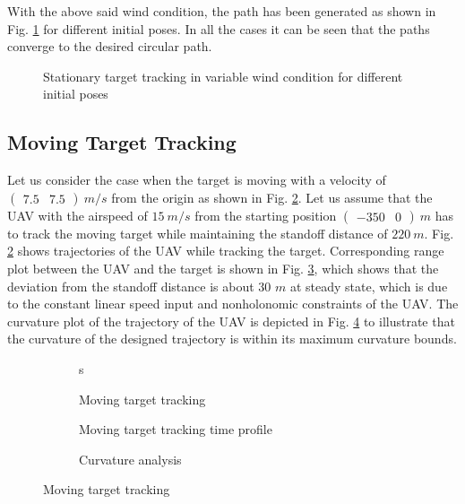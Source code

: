 \documentclass[Afour,sagev,times]{sagej}
\begin{document}
With the above said wind condition, the path has been generated as shown in Fig. \ref{fig:diffgg} for different initial poses.  In all the cases it can be seen that the paths converge to the desired circular path.

\begin{figure}[htpb]
	\centering
	\caption{Stationary target tracking in variable wind condition for different initial poses} 
	\label{fig:diffgg}
\end{figure}

\subsection{Moving Target Tracking}
Let us consider the case when the target is moving with a velocity of $\begin{pmatrix}
7.5 & 7.5 \end{pmatrix}~m/s$ from the origin as shown in Fig. \ref{fig:targ}. Let us assume that the UAV with the airspeed of $15~m/s$ from the starting position  $\begin{pmatrix} - 350& 0 \end{pmatrix}~m$ has to track the moving target while maintaining the standoff distance of $220~m$. Fig. \ref{fig:targ} shows trajectories of the UAV while tracking the target. Corresponding range plot between the UAV and the target is shown in Fig. \ref{fig:targ_time}, which shows that the deviation from the standoff distance is about $30$ $m$ at steady state, which is due to the constant linear speed input and nonholonomic constraints of the UAV. The curvature plot of the  trajectory of the UAV is depicted in Fig. \ref{fig:ka} to illustrate that the curvature of the designed trajectory is within its maximum curvature bounds.

\begin{figure}[htpb]
	\begin{subfigure}{0.5\textwidth}
	\centering
	\caption{Moving target tracking}s
	\label{fig:targ}
	\end{subfigure}
\begin{subfigure}{0.5\textwidth}
	\centering
	\caption{Moving target tracking time profile}
	\label{fig:targ_time}
	\end{subfigure}
\begin{subfigure}{0.5\textwidth}
	\centering
	\caption{Curvature analysis }
	\label{fig:ka}
\end{subfigure}
\caption{Moving target tracking}
\label{fig:fig_two}
\end{figure}
\end{document}
